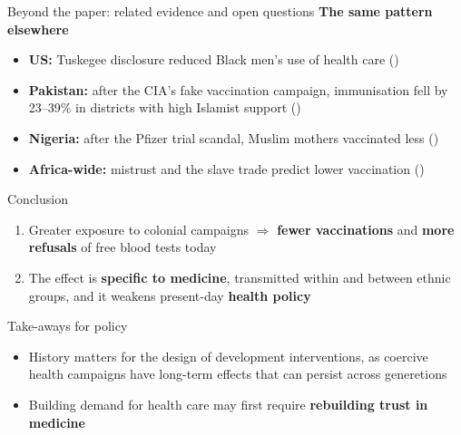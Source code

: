 \documentclass[aspectratio=1610]{beamer}
\newcommand{\highlight}[1]{\textcolor{accent}{\textbf{#1}}}
\newcommand{\refs}[1]{{\footnotesize\color{softgray}(\citealp{#1})}} %
\begin{document}
\begin{frame}{Beyond the paper: related evidence and open questions}
  \small
      \textbf{The same pattern elsewhere}
      \begin{itemize}
        \item \textbf{US:} Tuskegee disclosure reduced Black men's use of health care
          \refs{alsan_wanamaker_2018}
        \item \textbf{Pakistan:} after the CIA's fake vaccination campaign, immunisation fell by 23--39\%
          in districts with high Islamist support \refs{martinez_bravo_stegmann_2022}
        \item \textbf{Nigeria:} after the Pfizer trial scandal, Muslim mothers vaccinated less
          \refs{archibong_annan_2021}
        \item \textbf{Africa-wide:} mistrust and the slave trade predict lower vaccination
          \refs{stoop_etal_2021,athias_macina_2022}
      \end{itemize}
\end{frame}

\begin{frame}{Conclusion}
  \begin{enumerate}
    \item Greater exposure to colonial campaigns $\Rightarrow$ \textbf{fewer vaccinations} and \textbf{more refusals}
      of free blood tests today
    \item The effect is \textbf{specific to medicine}, transmitted within and between ethnic groups, and it weakens
      present-day \textbf{health policy}
  \end{enumerate}
  \vspace{0.6em}
  \begin{block}{Take-aways for policy}
    \begin{itemize}
      \item History matters for the design of development interventions, as coercive health campaigns have long-term effects that can persist across generetions
      \item Building demand for health care may first require \highlight{rebuilding trust in medicine}
    \end{itemize}
  \end{block}
\end{frame}

\appendix
\backupslidestrue
\end{document}

